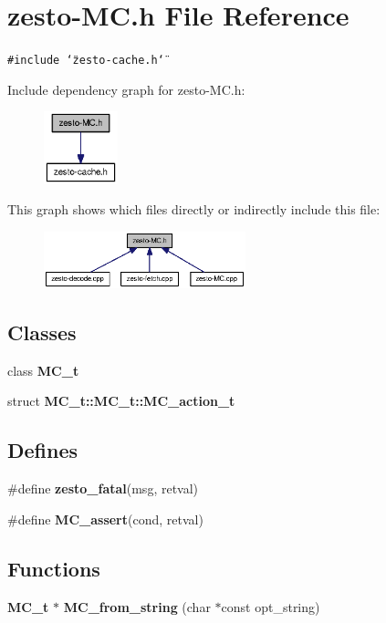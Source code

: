 \section{zesto-MC.h File Reference}
\label{zesto-MC_8h}
{\tt \#include \char`\"{}zesto-cache.h\char`\"{}}\par


Include dependency graph for zesto-MC.h:\nopagebreak
\begin{figure}[H]
\begin{center}
\leavevmode
\includegraphics[width=61pt]{zesto-MC_8h__incl}
\end{center}
\end{figure}


This graph shows which files directly or indirectly include this file:\nopagebreak
\begin{figure}[H]
\begin{center}
\leavevmode
\includegraphics[width=166pt]{zesto-MC_8h__dep__incl}
\end{center}
\end{figure}
\subsection*{Classes}
\begin{CompactItemize}
\item 
class {\bf MC\_\-t}
\item 
struct {\bf MC\_\-t::MC\_\-t::MC\_\-action\_\-t}
\end{CompactItemize}
\subsection*{Defines}
\begin{CompactItemize}
\item 
\#define {\bf zesto\_\-fatal}(msg, retval)
\item 
\#define {\bf MC\_\-assert}(cond, retval)
\end{CompactItemize}
\subsection*{Functions}
\begin{CompactItemize}
\item 
{\bf MC\_\-t} $\ast$ {\bf MC\_\-from\_\-string} (char $\ast$const opt\_\-string)
\end{CompactItemize}


